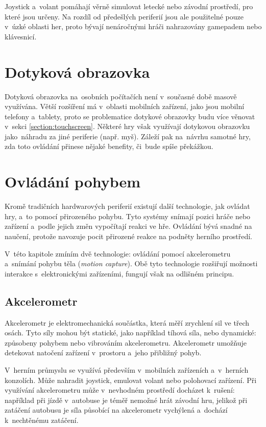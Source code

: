 \documentclass[thesis=B,czech,hidelinks]{FITthesis}[2012/06/26] %
\begin{document}
Joystick a~volant pomáhají věrně simulovat letecké nebo závodní prostředí, pro které jsou určeny. Na rozdíl od předešlých periferií jsou ale použitelné pouze v~úzké oblasti her, proto bývají nenáročnými hráči nahrazovány gamepadem nebo klávesnicí.

\section{Dotyková obrazovka}

Dotyková obrazovka na~osobních počítačích není v~současné době masově využívána. Větší rozšíření má v~oblasti mobilních zařízení, jako jsou mobilní telefony a~tablety, proto se problematice dotykové obrazovky budu více věnovat v~sekci \ref{section:touchscreen}. Některé hry však využívají dotykovou obrazovku jako~náhradu za jiné periferie (např. myš). Záleží pak na~návrhu samotné hry, zda toto ovládání přinese nějaké benefity, či~bude spíše překážkou.

\section{Ovládání pohybem}

Kromě tradičních hardwarových periferií existují další technologie, jak ovládat hry, a~to pomocí přirozeného pohybu. Tyto systémy snímají pozici hráče nebo zařízení a~podle jejich změn vypočítají reakci ve hře. Ovládání bývá snadné na naučení, protože navozuje pocit přirozené reakce na podněty herního prostředí.

V~této kapitole zmíním dvě technologie: ovládání pomocí akcelerometru a~snímání pohybu těla (\textit{motion capture}). Obě tyto technologie rozšiřují možnosti interakce s~elektronickými zařízeními, fungují však na odlišném principu.

\subsection{Akcelerometr}
\label{section:accelerometer}

Akcelerometr je elektromechanická součástka, která měří zrychlení sil ve třech osách. Tyto síly mohou být statické, jako například tíhová síla, nebo dynamické: způsobeny pohybem nebo vibrováním akcelerometru.\cite{acc} Akcelerometr umožňuje detekovat natočení zařízení v~prostoru a~jeho přibližný pohyb.

V~herním průmyslu se využívá především v~mobilních zařízeních a~v~herních konzolích. Může nahradit joystick, emulovat volant nebo polohovací zařízení. Při využívání akcelerometru může v~nevhodném prostředí docházet k~rušení: například při jízdě v~autobuse je téměř nemožné hrát závodní hru, jelikož při zatáčení autobusu je síla působící na akcelerometr vychýlená a~dochází k~nechtěnému zatáčení.
\end{document}
